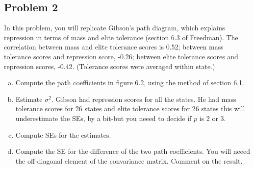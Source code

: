 \documentclass{amsart}
\begin{document}
		\subsection*{Problem 2} %
		\label{sub:problem_2}
			In this problem, you will replicate Gibson’s path diagram, which explains repression in terms of mass and elite tolerance (section 6.3 of Freedman). 
			The correlation between mass and elite tolerance scores is 0.52; between mass tolerance scores and repression score, -0.26; between elite tolerance scores and repression scores, -0.42. (Tolerance scores were averaged within state.)
			\begin{enumerate}[(a)]
				\item Compute the path coefficients in figure 6.2, using the method of section 6.1.
				\item Estimate $\sigma^{2}$. 
				Gibson had repression scores for all the states. 
				He had mass tolerance scores for 26 states and elite tolerance scores for 26 states this will underestimate the SEs, by a bit-but you neeed to decide if $p$ is 2 or 3.
				\item Compute SEs for the estimates.
				\item Compute the SE for the difference of the two path coefficients. 
				You will neeed the off-diagonal element of the convariance matrix. 
				Comment on the result.
			\end{enumerate}
\end{document}
